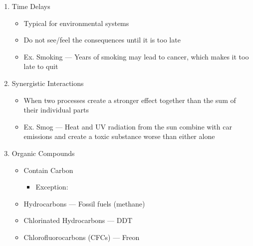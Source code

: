 \documentclass[12pt]{article}
\begin{document}
\begin{enumerate}
\begin{itemize}
    \end{itemize}

  \item Time Delays

    \begin{itemize}

      \item Typical for environmental systems

      \item Do not see/feel the consequences until it is too late

      \item Ex. Smoking — Years of smoking may lead to cancer, which makes it too late to quit

    \end{itemize}

  \item Synergistic Interactions

    \begin{itemize}

      \item When two processes create a stronger effect together than the sum of their individual parts

      \item Ex. Smog — Heat and UV radiation from the sun combine with car emissions and create a toxic substance worse than either alone

    \end{itemize}

  \item Organic Compounds

    \begin{itemize}

      \item Contain Carbon

        \begin{itemize}

          \item Exception: 

        \end{itemize}

      \item Hydrocarbons — Fossil fuels (methane)

      \item Chlorinated Hydrocarbons — DDT

      \item Chlorofluorocarbons (CFCs) — Freon

    \end{itemize}


\end{enumerate}
\end{document}
